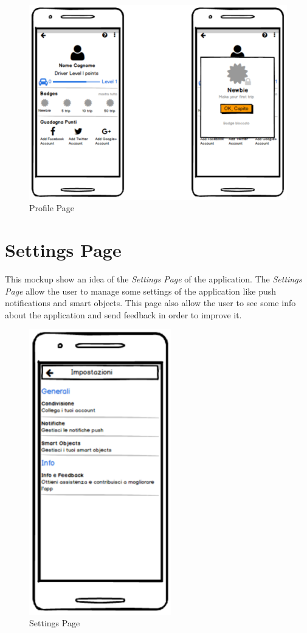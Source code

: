 \begin{figure}[htbp]
\centering
\includegraphics[width=\textwidth]{cpt/img/ProfilePage.png}
\caption{Profile Page}
\end{figure}

\clearpage
\section{Settings Page}
This mockup show an idea of the \textit{Settings Page} of the application. The \textit{Settings Page} allow the user to manage some settings of the application like push notifications and smart objects. This page also allow the user to see some info about the application and send feedback in order to improve it.\\

\begin{figure}[htbp]
\centering
\includegraphics[width=0.55\textwidth]{cpt/img/SettingsPage.png}
\caption{Settings Page}
\end{figure}

